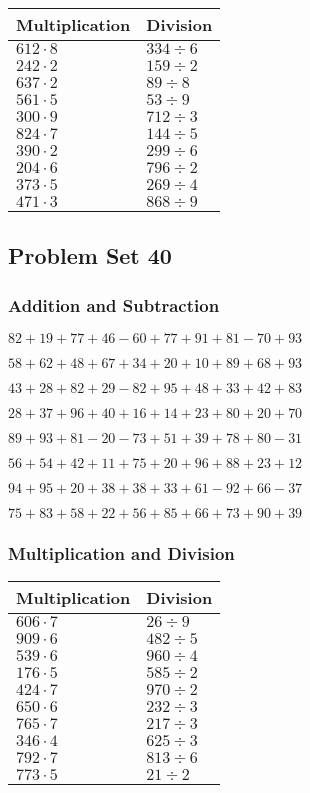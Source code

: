 \begin{longtable}[]{@{}ll@{}}
\toprule
Multiplication & Division\tabularnewline
\midrule
\endhead
\(612\cdot8\) & \(334÷6\)\tabularnewline
\(242\cdot2\) & \(159÷2\)\tabularnewline
\(637\cdot2\) & \(89÷8\)\tabularnewline
\(561\cdot5\) & \(53÷9\)\tabularnewline
\(300\cdot9\) & \(712÷3\)\tabularnewline
\(824\cdot7\) & \(144÷5\)\tabularnewline
\(390\cdot2\) & \(299÷6\)\tabularnewline
\(204\cdot6\) & \(796÷2\)\tabularnewline
\(373\cdot5\) & \(269÷4\)\tabularnewline
\(471\cdot3\) & \(868÷9\)\tabularnewline
\bottomrule
\end{longtable}

\hypertarget{problem-set-40}{%
\subsection{Problem Set 40}\label{problem-set-40}}

\hypertarget{addition-and-subtraction-39}{%
\subsubsection{Addition and
Subtraction}\label{addition-and-subtraction-39}}

\(82+19+77+46-60+77+91+81-70+93\)

\(58+62+48+67+34+20+10+89+68+93\)

\(43+28+82+29-82+95+48+33+42+83\)

\(28+37+96+40+16+14+23+80+20+70\)

\(89+93+81-20-73+51+39+78+80-31\)

\(56+54+42+11+75+20+96+88+23+12\)

\(94+95+20+38+38+33+61-92+66-37\)

\(75+83+58+22+56+85+66+73+90+39\)

\hypertarget{multiplication-and-division-39}{%
\subsubsection{Multiplication and
Division}\label{multiplication-and-division-39}}

\begin{longtable}[]{@{}ll@{}}
\toprule
Multiplication & Division\tabularnewline
\midrule
\endhead
\(606\cdot7\) & \(26÷9\)\tabularnewline
\(909\cdot6\) & \(482÷5\)\tabularnewline
\(539\cdot6\) & \(960÷4\)\tabularnewline
\(176\cdot5\) & \(585÷2\)\tabularnewline
\(424\cdot7\) & \(970÷2\)\tabularnewline
\(650\cdot6\) & \(232÷3\)\tabularnewline
\(765\cdot7\) & \(217÷3\)\tabularnewline
\(346\cdot4\) & \(625÷3\)\tabularnewline
\(792\cdot7\) & \(813÷6\)\tabularnewline
\(773\cdot5\) & \(21÷2\)\tabularnewline
\bottomrule
\end{longtable}

